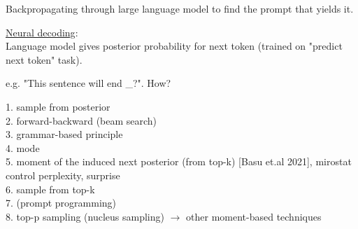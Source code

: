\documentclass[12pt,a4paper]{article}
\begin{document}
Backpropagating through large language model to find the prompt that yields it. 

\vspace{0.5cm}
\underline{Neural decoding}:\\
Language model gives posterior probability for next token (trained on "predict next token" task). 

e.g. "This sentence will end \_?". How?

1. sample from posterior\\
2. forward-backward (beam search)\\
3. grammar-based principle\\
4. mode \\
5. moment of the induced next posterior (from top-k) [Basu et.al 2021], mirostat control perplexity, surprise\\
6. sample from top-k\\
7. (prompt programming)\\
8. top-p sampling (nucleus sampling) $\rightarrow$ other moment-based techniques
\end{document}
